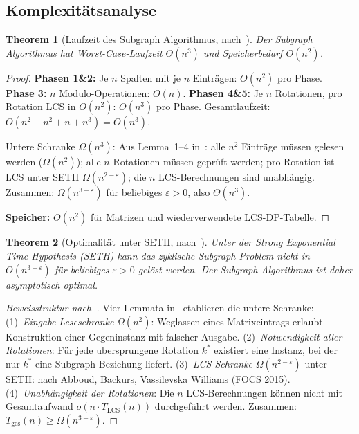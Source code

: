 \documentclass[a4paper, 12pt, twoside, openright]{report}
\newtheorem{theorem}{Theorem}[section]
\theoremstyle{definition}
\theoremstyle{definition}
\begin{document}
\subsection{Komplexitätsanalyse}

\begin{theorem}[Laufzeit des Subgraph Algorithmus, nach~\citep{epp2026subgraph}]
\label{thm:laufzeit_subgraph}
Der Subgraph Algorithmus hat Worst-Case-Laufzeit $\Theta(n^3)$ und
Speicherbedarf $O(n^2)$.
\end{theorem}

\begin{proof}
\textbf{Phasen 1\&2:} Je $n$ Spalten mit je $n$ Einträgen: $O(n^2)$ pro Phase.
\textbf{Phase 3:} $n$ Modulo-Operationen: $O(n)$.
\textbf{Phasen 4\&5:} Je $n$ Rotationen, pro Rotation LCS in $O(n^2)$: $O(n^3)$
pro Phase. Gesamtlaufzeit: $O(n^2+n^2+n+n^3) = O(n^3)$.

Untere Schranke $\Omega(n^3)$: Aus Lemma~1--4 in~\citep{epp2026subgraph}:
alle $n^2$ Einträge müssen gelesen werden ($\Omega(n^2)$); alle $n$ Rotationen
müssen geprüft werden; pro Rotation ist LCS unter SETH $\Omega(n^{2-\varepsilon})$;
die $n$ LCS-Berechnungen sind unabhängig. Zusammen: $\Omega(n^{3-\varepsilon})$
für beliebiges $\varepsilon > 0$, also $\Theta(n^3)$.

\textbf{Speicher:} $O(n^2)$ für Matrizen und wiederverwendete LCS-DP-Tabelle.
\end{proof}

\begin{theorem}[Optimalität unter SETH, nach~\citep{epp2026subgraph}]
\label{thm:optimalitaet_subgraph}
Unter der Strong Exponential Time Hypothesis (SETH) kann das zyklische
Subgraph-Problem nicht in $O(n^{3-\varepsilon})$ für beliebiges $\varepsilon > 0$
gelöst werden. Der Subgraph Algorithmus ist daher asymptotisch \emph{optimal}.
\end{theorem}

\begin{proof}[Beweisstruktur nach~\citep{epp2026subgraph}]
Vier Lemmata in~\citep{epp2026subgraph} etablieren die untere Schranke:
(1)~\emph{Eingabe-Leseschranke} $\Omega(n^2)$: Weglassen eines Matrixeintrags
erlaubt Konstruktion einer Gegeninstanz mit falscher Ausgabe.
(2)~\emph{Notwendigkeit aller Rotationen}: Für jede ubersprungene Rotation $k^*$
existiert eine Instanz, bei der nur $k^*$ eine Subgraph-Beziehung liefert.
(3)~\emph{LCS-Schranke} $\Omega(n^{2-\varepsilon})$ unter SETH: nach Abboud,
Backurs, Vassilevska Williams (FOCS 2015).
(4)~\emph{Unabhängigkeit der Rotationen}: Die $n$ LCS-Berechnungen können nicht
mit Gesamtaufwand $o(n \cdot T_\mathrm{LCS}(n))$ durchgeführt werden.
Zusammen: $T_\mathrm{ges}(n) \geq \Omega(n^{3-\varepsilon})$.
\end{proof}
\end{document}

